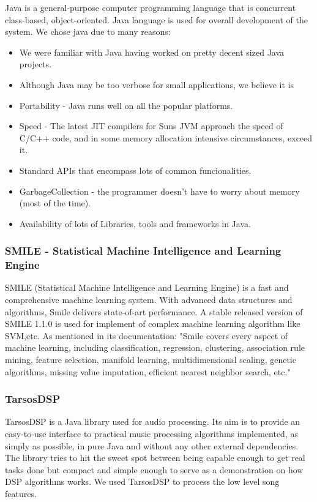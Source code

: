 Java is a general-purpose computer programming language that is concurrent class-based, object-oriented. 
Java language is used for overall development of the system.
We chose java due to many reasons:

\begin{itemize}
    \item We were familiar with Java having worked on pretty decent sized Java projects.
    \item Although Java may be too verbose for small applications, we believe it is 
    \item Portability - Java runs well on all the popular platforms.
    \item Speed - The latest JIT compilers for Suns JVM approach the speed of C/C++ code, and in some memory allocation intensive circumstances, exceed it.
    \item Standard APIs that encompass lots of common funcionalities.
    \item GarbageCollection - the programmer doesn't have to worry about memory (most of the time).
    \item Availability of lots of Libraries, tools and frameworks in Java.
\end{itemize}

\subsubsection{SMILE - Statistical Machine Intelligence and Learning Engine}

SMILE (Statistical Machine Intelligence and Learning Engine) is a fast and comprehensive machine learning system. With advanced data structures and algorithms, Smile delivers state-of-art performance.
A stable released version of SMILE 1.1.0 is used for implement of complex machine learning algorithm like SVM,etc.
As mentioned in its documentation:
"Smile covers every aspect of machine learning, including classification, regression, clustering, association rule mining, feature selection, manifold learning, multidimensional scaling, genetic algorithms, missing value imputation, efficient nearest neighbor search, etc."

\subsubsection{TarsosDSP}

    TarsosDSP is a Java library used for audio processing. 
    Its aim is to provide an easy-to-use interface to practical music processing algorithms implemented, as simply as possible, in pure Java and without any other external dependencies. 
    The library tries to hit the sweet spot between being capable enough to get real tasks done but compact and simple enough to serve as a demonstration on how DSP algorithms works.
    We used TarsosDSP to process the low level song features.

